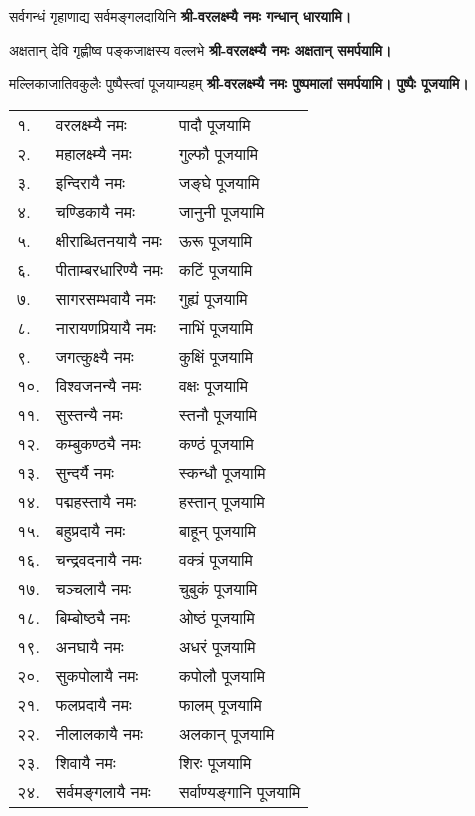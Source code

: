 \begin{center}
{सर्वगन्धं गृहाणाद्य सर्वमङ्गलदायिनि}
\textbf{श्री-वरलक्ष्म्यै नमः गन्धान् धारयामि।}
\medskip

{अक्षतान् देवि गृह्णीष्व पङ्कजाक्षस्य वल्लभे}
\textbf{श्री-वरलक्ष्म्यै नमः अक्षतान् समर्पयामि।}
\medskip

{मल्लिकाजातिवकुलैः पुष्पैस्त्वां पूजयाम्यहम्}
\textbf{श्री-वरलक्ष्म्यै नमः पुष्पमालां समर्पयामि। पुष्पैः पूजयामि।}
\medskip

 
\end{center}


\begin{longtable}{ll@{— }l}
१. & वरलक्ष्म्यै नमः & पादौ पूजयामि\\
२. & महालक्ष्म्यै नमः & गुल्फौ पूजयामि\\
३. & इन्दिरायै नमः &  जङ्घे पूजयामि\\
४. & चण्डिकायै नमः & जानुनी पूजयामि\\
५. & क्षीराब्धितनयायै नमः & ऊरू  पूजयामि\\
६. & पीताम्बरधारिण्यै नमः & कटिं पूजयामि\\
७. & सागरसम्भवायै नमः & गुह्यं पूजयामि\\
८. & नारायणप्रियायै नमः & नाभिं पूजयामि\\
९. & जगत्कुक्ष्यै नमः & कुक्षिं पूजयामि\\
१०. & विश्वजनन्यै नमः & वक्षः पूजयामि\\
११. & सुस्तन्यै नमः & स्तनौ पूजयामि\\
१२. & कम्बुकण्ठ्यै नमः &  कण्ठं पूजयामि\\
१३. & सुन्दर्यै नमः & स्कन्धौ पूजयामि\\
१४. & पद्महस्तायै नमः & हस्तान् पूजयामि\\
१५. & बहुप्रदायै नमः & बाहून् पूजयामि\\
१६. & चन्द्रवदनायै नमः & वक्त्रं पूजयामि\\
१७. & चञ्चलायै नमः & चुबुकं पूजयामि\\
१८. & बिम्बोष्ठ्यै नमः & ओष्ठं पूजयामि\\
१९. & अनघायै नमः & अधरं पूजयामि\\
२०. & सुकपोलायै नमः & कपोलौ पूजयामि\\
२१. & फलप्रदायै नमः & फालम् पूजयामि\\
२२. & नीलालकायै नमः & अलकान् पूजयामि\\
२३. & शिवायै नमः & शिरः पूजयामि\\
२४. & सर्वमङ्गलायै नमः &  सर्वाण्यङ्गानि पूजयामि\\
\end{longtable}

